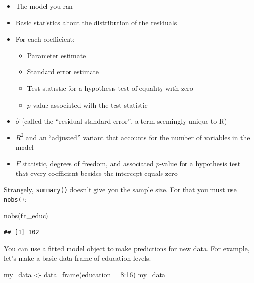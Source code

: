 \documentclass[
  12pt,
  oneside,openany]{book}
\newenvironment{Shaded}{\begin{snugshade}}{\end{snugshade}}
\newcommand{\AttributeTok}[1]{\textcolor[rgb]{0.77,0.63,0.00}{#1}}
\newcommand{\DecValTok}[1]{\textcolor[rgb]{0.00,0.00,0.81}{#1}}
\newcommand{\FunctionTok}[1]{\textcolor[rgb]{0.00,0.00,0.00}{#1}}
\newcommand{\NormalTok}[1]{#1}
\newcommand{\OtherTok}[1]{\textcolor[rgb]{0.56,0.35,0.01}{#1}}
\newcommand{\SpecialCharTok}[1]{\textcolor[rgb]{0.00,0.00,0.00}{#1}}
\providecommand{\tightlist}{%
  \setlength{\itemsep}{0pt}\setlength{\parskip}{0pt}}
\begin{document}
\begin{itemize}
\tightlist
\item
  The model you ran
\item
  Basic statistics about the distribution of the residuals
\item
  For each coefficient:

  \begin{itemize}
  \tightlist
  \item
    Parameter estimate
  \item
    Standard error estimate
  \item
    Test statistic for a hypothesis test of equality with zero
  \item
    \(p\)-value associated with the test statistic
  \end{itemize}
\item
  \(\hat{\sigma}\) (called the ``residual standard error'', a term seemingly unique to R)
\item
  \(R^2\) and an ``adjusted'' variant that accounts for the number of variables in the model
\item
  \(F\) statistic, degrees of freedom, and associated \(p\)-value for a hypothesis test that every coefficient besides the intercept equals zero
\end{itemize}

Strangely, \texttt{summary()} doesn't give you the sample size. For that you must use \texttt{nobs()}:

\begin{Shaded}
\begin{Highlighting}[]
\FunctionTok{nobs}\NormalTok{(fit\_educ)}
\end{Highlighting}
\end{Shaded}

\begin{verbatim}
## [1] 102
\end{verbatim}

You can use a fitted model object to make predictions for new data. For example, let's make a basic data frame of education levels.

\begin{Shaded}
\begin{Highlighting}[]
\NormalTok{my\_data }\OtherTok{\textless{}{-}} \FunctionTok{data\_frame}\NormalTok{(}\AttributeTok{education =} \DecValTok{8}\SpecialCharTok{:}\DecValTok{16}\NormalTok{)}
\NormalTok{my\_data}
\end{Highlighting}
\end{Shaded}
\end{document}
